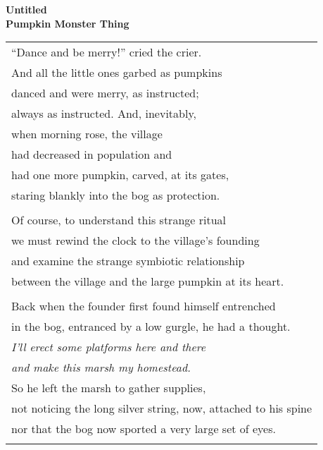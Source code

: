 \documentclass{article}
\begin{document}
\newcommand{\h}{\hspace*{4ex}}

\begin{center}
\textbf{Untitled} \\ %
{\small\textbf{Pumpkin Monster Thing}} \\
\vspace*{2ex}
\begin{tabular}{l}
``Dance and be merry!'' cried the crier. \\
And all the little ones garbed as pumpkins \\
danced and were merry, as instructed; \\
always as instructed. And, inevitably, \\
when morning rose, the village \\
had decreased in population and \\
had one more pumpkin, carved, at its gates, \\
staring blankly into the bog as protection. \\
\\
Of course, to understand this strange ritual \\
we must rewind the clock to the village's founding \\
and examine the strange symbiotic relationship \\
between the village and the large pumpkin at its heart. \\
\\
Back when the founder first found himself entrenched \\
in the bog, entranced by a low gurgle, he had a thought. \\
\h \textit{I'll erect some platforms here and there} \\
\h \textit{and make this marsh my homestead.} \\
So he left the marsh to gather supplies, \\
not noticing the long silver string, now, attached to his spine \\
nor that the bog now sported a very large set of eyes. \\
\\
\end{tabular}
\end{center}
\end{document}

